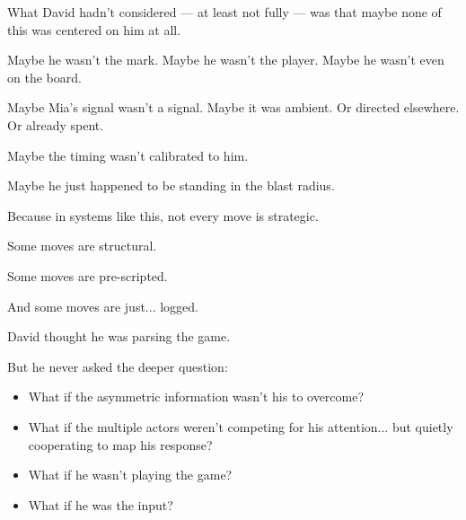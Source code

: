 \medskip

What David hadn’t considered ---
at least not fully ---
was that maybe none of this was centered on him at all.

Maybe he wasn’t the mark.
Maybe he wasn’t the player.
Maybe he wasn’t even on the board.

Maybe Mia’s signal wasn’t a signal.
Maybe it was ambient.
Or directed elsewhere.
Or already spent.

Maybe the timing wasn’t calibrated to him.

Maybe he just happened to be standing in the blast radius.

Because in systems like this,
not every move is strategic.

Some moves are structural.

Some moves are pre-scripted.

And some moves are just... logged.

David thought he was parsing the game.

But he never asked the deeper question:

\begin{itemize}
    \item What if the asymmetric information wasn't his to overcome?
    \item What if the multiple actors weren’t competing for his attention...
        but quietly cooperating to map his response?
    \item What if he wasn’t playing the game?
    \item What if he was the input?
\end{itemize}

